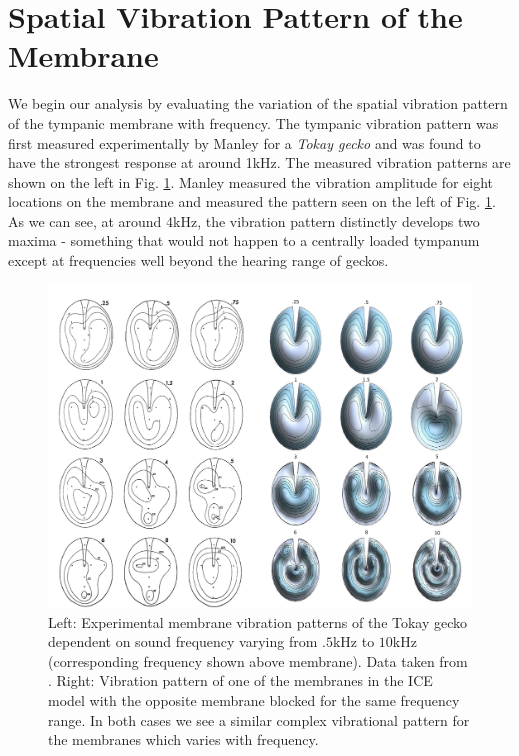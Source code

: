 \section{Spatial Vibration Pattern of the Membrane}\label{vibrationpatternchapter}
We begin our analysis by evaluating the variation of the spatial vibration pattern of the tympanic membrane
with frequency. The tympanic vibration pattern was first measured experimentally by Manley \cite{manleygecko1}
for a \emph{Tokay gecko} and was found to have the strongest response at around 1kHz. The measured vibration patterns
are shown on the left in Fig. \ref{manleygeckotympanum}. Manley measured the vibration amplitude for eight locations on the membrane and measured the pattern
seen on the left of Fig. \ref{manleygeckotympanum}. As we can see, at around $4$kHz, the vibration pattern
distinctly develops two maxima - something that would not happen to a centrally loaded tympanum except
at frequencies well beyond the hearing range of geckos.
\begin{figure}[ht!]
 \centering
 \includegraphics[width=1.0\linewidth]{Diagrams/manleymodelcomparison.png}
 \caption[Tympanic membrane vibration profiles for the Tokay gecko.]{Left: Experimental membrane vibration patterns of the Tokay gecko dependent
 on sound frequency varying from $.5$kHz to $10$kHz (corresponding frequency shown above membrane). Data taken from \cite{manleygecko1}. Right: Vibration
 pattern of one of the membranes in the ICE model with the opposite membrane blocked for the same frequency range. In both cases we see a similar
 complex vibrational pattern for the membranes which varies with frequency.}
  \label{manleygeckotympanum}
\end{figure}

